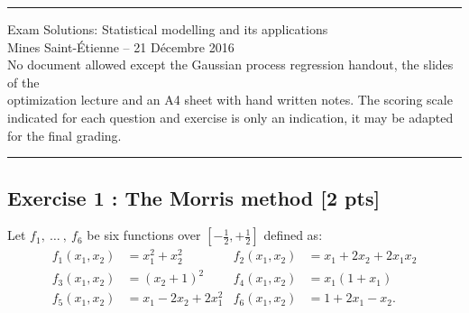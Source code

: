 \documentclass[a4paper,10pt]{article}
\begin{document}
\begin{center}
\hrule \vspace{3mm}
	{\Large Exam Solutions: Statistical modelling and its applications}\\ \vspace{3mm}
	{Mines Saint-\'Etienne -- 21 Décembre 2016} \\  \vspace{2mm}
	{\footnotesize No document allowed except the Gaussian process regression handout, the slides of the \\ optimization lecture and an A4 sheet with hand written notes. The scoring scale indicated for each question and exercise is only an indication, it may be adapted for the final grading. }\\ \vspace{3mm}
	\hrule
\end{center}
\vspace{5mm}

\subsection*{Exercise 1 : The Morris method \hfill [2 pts]} 

Let $f_1,\ \dots \ ,\ f_6$ be six functions over $[-\frac{1}{2}, + \frac{1}{2}]$ defined as:
\begin{align*}
f_1 \left(x_1, x_2 \right) &= x_1^2 + x_2^2 & f_2 \left(x_1, x_2 \right) &= x_1 + 2 x_2 + 2x_1 x_2  \\  
f_3\left(x_1, x_2 \right)&= \left(x_2 + 1\right)^2 & f_4 \left(x_1, x_2\right)&= x_1\left(1+x_1\right) \\  
f_5 \left(x_1, x_2 \right) &= x_1 - 2 x_2 + 2x_1^2 & f_6 \left(x_1, x_2 \right) &= 1+ 2 x_1 - x_2.
\end{align*}
\end{document}
